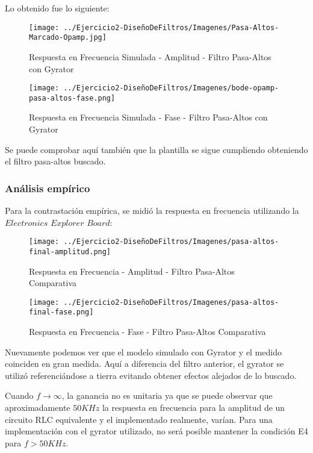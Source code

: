 Lo obtenido fue lo siguiente:

\begin{figure}[H]
    \centering
    \texttt{[image: ../Ejercicio2-DiseñoDeFiltros/Imagenes/Pasa-Altos-Marcado-Opamp.jpg]}
    \caption{Respuesta en Frecuencia Simulada - Amplitud - Filtro Pasa-Altos con Gyrator}
\end{figure}

\begin{figure}[H]
    \centering
    \texttt{[image: ../Ejercicio2-DiseñoDeFiltros/Imagenes/bode-opamp-pasa-altos-fase.png]}
    \caption{Respuesta en Frecuencia Simulada - Fase - Filtro Pasa-Altos con Gyrator}
\end{figure}

Se puede comprobar aquí también que la plantilla se sigue cumpliendo obteniendo el filtro pasa-altos buscado.

\subsubsection{Análisis empírico}

Para la contrastación empírica, se midió la respuesta en frecuencia utilizando la $Electronics$ $Explorer$ $Board$:

\begin{figure}[H]
    \centering
    \texttt{[image: ../Ejercicio2-DiseñoDeFiltros/Imagenes/pasa-altos-final-amplitud.png]}
    \caption{Respuesta en Frecuencia - Amplitud - Filtro Pasa-Altos Comparativa}
\end{figure}

\begin{figure}[H]
    \centering
    \texttt{[image: ../Ejercicio2-DiseñoDeFiltros/Imagenes/pasa-altos-final-fase.png]}
    \caption{Respuesta en Frecuencia - Fase - Filtro Pasa-Altos Comparativa}
\end{figure}

Nuevamente podemos ver que el modelo simulado con Gyrator y el medido coinciden en gran medida. Aquí a diferencia del filtro anterior,
el gyrator se utilizó referenciándose a tierra evitando obtener efectos alejados de lo buscado.


Cuando $f \to \infty$, la ganancia no es unitaria ya que se puede observar que aproximadamente
$50 KHz$ la respuesta en frecuencia para la amplitud de un circuito RLC equivalente y el implementado realmente, varían.
Para una implementación con el gyrator utilizado, no será posible mantener la condición E4 para $f>50KHz$.

